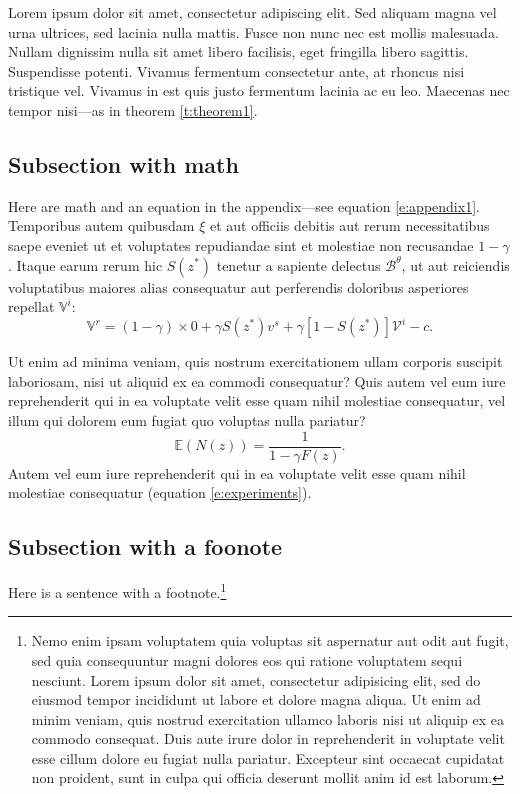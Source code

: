 \documentclass[letterpaper,11pt,leqno]{article}
\begin{document}
Lorem ipsum dolor sit amet, consectetur adipiscing elit. Sed aliquam magna vel urna ultrices, sed lacinia nulla mattis. Fusce non nunc nec est mollis malesuada. Nullam dignissim nulla sit amet libero facilisis, eget fringilla libero sagittis. Suspendisse potenti. Vivamus fermentum consectetur ante, at rhoncus nisi tristique vel. Vivamus in est quis justo fermentum lacinia ac eu leo. Maecenas nec tempor nisi---as in theorem \ref{t:theorem1}.

\subsection{Subsection with math}

Here are math and an equation in the appendix---see equation \eqref{e:appendix1}. Temporibus autem quibusdam $\xi$ et aut officiis debitis aut rerum necessitatibus saepe eveniet ut et voluptates repudiandae sint et molestiae non recusandae $1-\gamma$. Itaque earum rerum hic $S(z^*)$ tenetur a sapiente delectus $\mathcal{B}^\theta$, ut aut reiciendis voluptatibus maiores alias consequatur aut perferendis doloribus asperiores repellat $\mathbb{V}^i$:
\begin{equation}
\mathbb{V}^r = (1-\gamma) \times 0 +\gamma S(z^*) v^s+\gamma [1-S(z^*)] \mathcal{V}^i-c.
\label{e:appendix1}\end{equation}

Ut enim ad minima veniam, quis nostrum exercitationem ullam corporis suscipit laboriosam, nisi ut aliquid ex ea commodi consequatur? Quis autem vel eum iure reprehenderit qui in ea voluptate velit esse quam nihil molestiae consequatur, vel illum qui dolorem eum fugiat quo voluptas nulla pariatur? 
\begin{equation}
\mathbb{E}(N(z)) = \frac{1}{1-\gamma F(z)}.
\label{e:experiments}\end{equation}
Autem vel eum iure reprehenderit qui in ea voluptate velit esse quam nihil molestiae consequatur (equation \eqref{e:experiments}).

\subsection{Subsection with a foonote}

Here is a sentence with a footnote.\footnote{Nemo enim ipsam voluptatem quia voluptas sit aspernatur aut odit aut fugit, sed quia consequuntur magni dolores eos qui ratione voluptatem sequi nesciunt. Lorem ipsum dolor sit amet, consectetur adipisicing elit, sed do eiusmod tempor incididunt ut labore et dolore magna aliqua. Ut enim ad minim veniam,
quis nostrud exercitation ullamco laboris nisi ut aliquip ex ea commodo
consequat. Duis aute irure dolor in reprehenderit in voluptate velit esse
cillum dolore eu fugiat nulla pariatur. Excepteur sint occaecat cupidatat non
proident, sunt in culpa qui officia deserunt mollit anim id est laborum.} 
\end{document}
